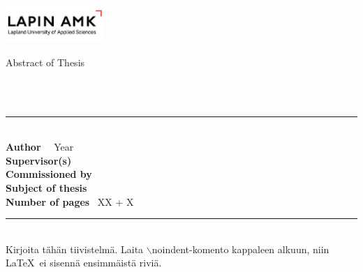 \vspace{5cm}
\begin{center}

\taustaprojekti\\
\vspace{0.7cm}
\tekija \\
\vspace{0.7cm}
\opinnaytetyo \\
\koulutus\\
\tutkintonimike

\end{center}

\begin{center}\fontsize{16pt}{1pt}\selectfont
\aika
\end{center}


\newpage\null
\pagestyle{empty}  %

\begin{minipage}{0.4\textwidth}
\includegraphics[width=3.7cm]{ylatunnisteLogo}
\end{minipage}
\begin{minipage}{0.6\textwidth}\raggedleft
Abstract of Thesis\\
\end{minipage}

\Koulutus \\
\indent\tutkintonimike \\
\rule{\textwidth}{.1mm}\\

\noindent \textbf{Author} \	\tekija\
Year \	\aika \\
\noindent \textbf{Supervisor(s)}	\ \Ohjaajat \\
\noindent \textbf{Commissioned by}	\ \Toimeksiantaja \\
\noindent \textbf{Subject of thesis} \	\opinnaytetyo \\
\noindent \textbf{Number of pages} \	XX + X \\
\rule{\textwidth}{.1mm}\\


\noindent Kirjoita tähän tiivistelmä. Laita $\backslash${noindent}-komento kappaleen
alkuun, niin \LaTeX\, ei sisennä ensimmäistä riviä.

